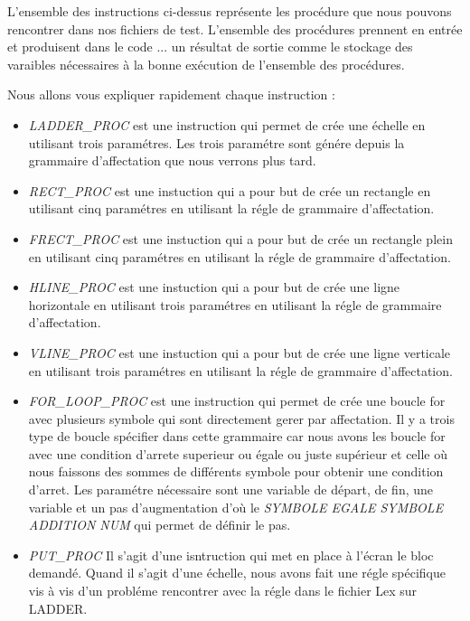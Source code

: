 L'ensemble des instructions ci-dessus représente les procédure que nous pouvons rencontrer dans nos fichiers de test. L'ensemble des procédures prennent en entrée et produisent dans le code {...} un résultat de sortie comme le stockage des varaibles nécessaires à la bonne exécution de l'ensemble des procédures.


Nous allons vous expliquer rapidement chaque instruction : 

\begin{itemize}

\item \textit{LADDER\_PROC} est une instruction qui permet de crée une échelle en utilisant trois paramétres. Les trois paramétre sont génére depuis la grammaire d'affectation que nous verrons plus tard.

\item \textit{RECT\_PROC} est une instuction qui a pour but de crée un rectangle en utilisant cinq paramétres en utilisant la régle de grammaire d'affectation.

\item \textit{FRECT\_PROC} est une instuction qui a pour but de crée un rectangle plein en utilisant cinq paramétres en utilisant la régle de grammaire d'affectation.

\item \textit{HLINE\_PROC} est une instuction qui a pour but de crée une ligne horizontale en utilisant trois paramétres en utilisant la régle de grammaire d'affectation.

\item \textit{VLINE\_PROC} est une instuction qui a pour but de crée une ligne verticale en utilisant trois paramétres en utilisant la régle de grammaire d'affectation.

\item \textit{FOR\_LOOP\_PROC} est une instruction qui permet de crée une boucle for avec plusieurs symbole qui sont directement gerer par affectation. Il y a trois type de boucle spécifier dans cette grammaire car nous avons les boucle for avec une condition d'arrete superieur ou égale ou juste supérieur et celle où nous faissons des sommes de différents symbole pour obtenir une condition d'arret. Les paramétre nécessaire sont une variable de départ, de fin, une variable et un pas d'augmentation d'où le \textit{ SYMBOLE EGALE SYMBOLE ADDITION NUM} qui permet de définir le pas.

\item \textit{PUT\_PROC} Il s'agit d'une isntruction qui met en place à l'écran le bloc demandé. Quand il s'agit d'une échelle, nous avons fait une régle spécifique vis à vis d'un probléme rencontrer avec la régle dans le fichier Lex sur LADDER.

\end{itemize}

